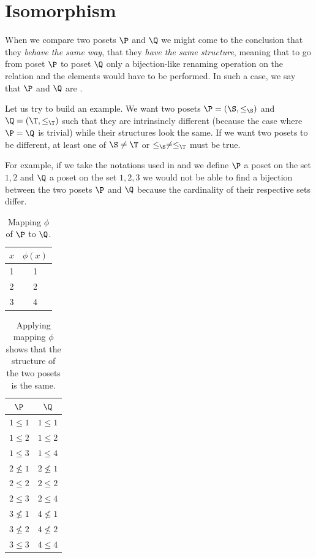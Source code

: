 \section{Isomorphism}

When we compare two posets $\P$ and $\Q$ we might come to the conclusion that
they \emph{behave the same way}, that they \emph{have the same structure},
meaning that to go from poset $\P$ to poset $\Q$ only a bijection-like renaming
operation on the relation and the elements would have to be performed. In such
a case, we say that $\P$ and $\Q$ are .

Let us try to build an example. We want two posets $\P = (\S, \le_{\S})$ and $\Q =
(\T, \le_{\T})$ such that they are intrinsincly different (because the case where
$\P = \Q$ is trivial) while their structures look the same. If we want two posets
to be different, at least one of $\S \neq \T$ or $\le_{\S} \neq \le_{\T}$ must be true.

For example, if we take the notations used in  and we
define $\P$ a poset on the set ${1, 2}$ and $\Q$ a poset on the set ${1, 2, 3}$
we would not be able to find a bijection between the two posets $\P$ and $\Q$
because the cardinality of their respective sets differ.

\begin{table}
\centering
\caption{Mapping $\phi$ of $\P$ to $\Q$.}
\label{table:poset:iso:a}
\begin{tabular}{c|c}
	$x$ & $\phi(x)$ \\
	\hline
	1 & 1 \\
	2 & 2 \\
	3 & 4 \\
\end{tabular}
\end{table}

\begin{table}
\centering
\caption{Applying mapping $\phi$ shows that the structure of the two posets is
the same.}
\label{table:poset:iso:b}
\begin{tabular}{c|c}
	$\P$ & $\Q$\\
	\hline
	$1 \le 1$   & $1 \le 1$\\
	$1 \le 2$   & $1 \le 2$\\
	$1 \le 3$   & $1 \le 4$\\
	$2 \nleq 1$ & $2 \nleq 1$\\
	$2 \le 2$   & $2 \le 2$\\
	$2 \le 3$   & $2 \le 4$\\
	$3 \nleq 1$ & $4 \nleq 1$\\
	$3 \nleq 2$ & $4 \nleq 2$\\
	$3 \le 3$   & $4 \le 4$\\
\end{tabular}
\end{table}

